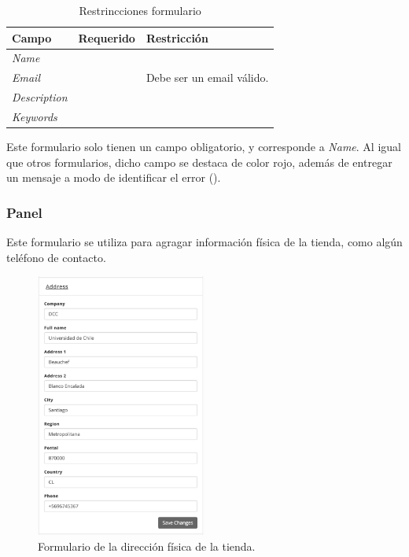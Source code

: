 \begin{table}[H]
    \centering
	\begin{tabular}{ |l|c||l| }
		\hline Campo & Requerido & Restricción \\ \hline
		\multirow{1}{*}{\textit{Name}} 			&  {\checkmark} &  \\ \hline
		\multirow{1}{*}{\textit{Email}} 		&  				&  Debe ser un email válido.\\ \hline
		\multirow{1}{*}{\textit{Description}} 	&  				&  \\ \hline
		\multirow{1}{*}{\textit{Keywords}} 		&  				&  \\ \hline
		\hline
	\end{tabular}
 	\caption{Restrincciones formulario \generalPanel}
    \label{tab:dashboard:ecommerce:form:general}
\end{table}


Este formulario solo tienen un campo obligatorio, y corresponde a \textit{Name}. Al igual que otros formularios, dicho campo se destaca de color rojo, además de entregar un mensaje a modo de identificar el error ().



\subsubsection*{Panel \addressPanel}\label{capitulo:solucionImplementada:dashboard:subsubsection:addressPanel}

Este formulario se utiliza para agragar información física de la tienda, como algún teléfono de contacto.

\begin{figure}[H]
	\centering
	\includegraphics[width=0.5\textwidth]{figuras/dashboard/ecommerce/address/menu.png}
	\caption{Formulario de la dirección física de la tienda.}
	\label{figure:dashboard:ecommerce:address:menu}
\end{figure}

